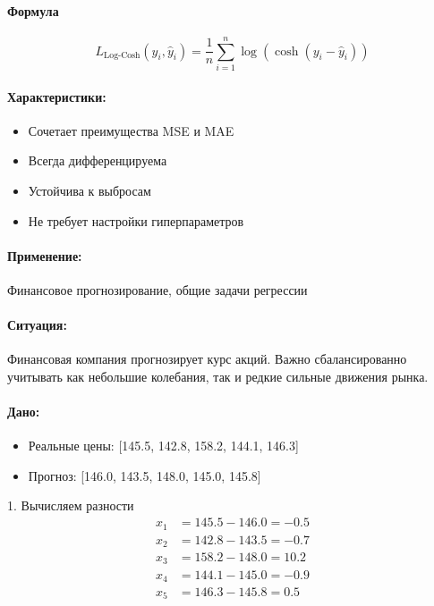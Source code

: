 \paragraph{Формула}

\[
L_{\text{Log-Cosh}}(y_i, \hat{y}_i) = \frac{1}{n} \sum_{i=1}^{n} \log(\cosh(y_i - \hat{y}_i))
\]

\paragraph{Характеристики:}
\begin{itemize}
    \item Сочетает преимущества MSE и MAE
    \item Всегда дифференцируема
    \item Устойчива к выбросам
    \item Не требует настройки гиперпараметров
\end{itemize}

\paragraph{Применение:} Финансовое прогнозирование, общие задачи регрессии

\paragraph{Ситуация:} Финансовая компания прогнозирует курс акций. Важно сбалансированно учитывать как небольшие колебания, так и редкие сильные движения рынка.

\paragraph{Дано:}
\begin{itemize}
    \item Реальные цены: [145.5, 142.8, 158.2, 144.1, 146.3]
    \item Прогноз: [146.0, 143.5, 148.0, 145.0, 145.8]
\end{itemize}

1. Вычисляем разности
\[
\begin{aligned}
x_1 &= 145.5 - 146.0 = -0.5 \\
x_2 &= 142.8 - 143.5 = -0.7 \\
x_3 &= 158.2 - 148.0 = 10.2 \\
x_4 &= 144.1 - 145.0 = -0.9 \\
x_5 &= 146.3 - 145.8 = 0.5
\end{aligned}
\]

